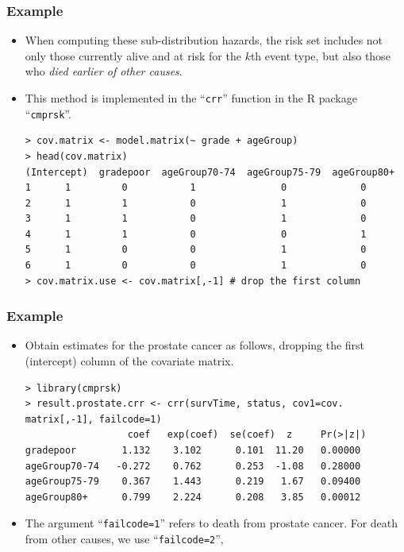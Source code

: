 \documentclass{beamer}
\newcommand{\empr}[1]{{\emph{\color{red}#1}}}
\begin{document}
\pagebreak
\begin{frame}[fragile]
\frametitle{Example}
\begin{itemize}
\item When computing these sub-distribution hazards, the risk set includes not only those currently alive and at risk for the $k$th event type, but also those who \empr{died earlier of other causes}.
\item This method is implemented in the ``\texttt{crr}'' function in the R package ``\texttt{cmprsk}''.
\begin{Verbatim}
> cov.matrix <- model.matrix(~ grade + ageGroup)
> head(cov.matrix)
(Intercept)  gradepoor  ageGroup70-74  ageGroup75-79  ageGroup80+
1      1         0           1               0             0
2      1         1           0               1             0
3      1         1           0               1             0
4      1         1           0               0             1
5      1         0           0               1             0
6      1         0           0               1             0	
> cov.matrix.use <- cov.matrix[,-1] # drop the first column
\end{Verbatim}  
\end{itemize}
\end{frame}


\pagebreak
\begin{frame}[fragile]
\frametitle{Example}
\begin{itemize}
\item Obtain estimates for the prostate cancer as follows, dropping the first (intercept) column of the covariate matrix.
\begin{Verbatim}
> library(cmprsk)
> result.prostate.crr <- crr(survTime, status, cov1=cov.
matrix[,-1], failcode=1)
                  coef   exp(coef)  se(coef)  z     Pr(>|z|) 
gradepoor        1.132    3.102      0.101  11.20   0.00000
ageGroup70-74   -0.272    0.762      0.253  -1.08   0.28000
ageGroup75-79    0.367    1.443      0.219   1.67   0.09400
ageGroup80+      0.799    2.224      0.208   3.85   0.00012
\end{Verbatim}  
\item The argument ``\texttt{failcode=1}'' refers to death from prostate cancer. For death from other causes, we use ``\texttt{failcode=2}'',
\end{itemize}
\end{frame}
\end{document}
